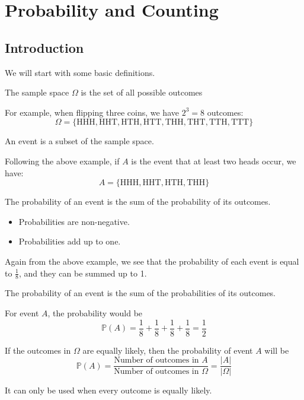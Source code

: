 \chapter{Probability and Counting}

\section{Introduction}

We will start with some basic definitions.

\begin{definition}
    The sample space \(\Omega\) is the set of all possible outcomes
\end{definition}

For example, when flipping three coins, we have \(2^3 = 8\) outcomes:
\[
    \Omega = \{\text{HHH}, \text{HHT}, \text{HTH}, \text{HTT}, \text{THH}, \text{THT}, \text{TTH}, \text{TTT}\}
\]

\begin{definition}[Event]
    An event is a subset of the sample space.
\end{definition}

Following the above example, if \(A\) is the event that at least two heads occur, we have:
\[
    A = \{\text{HHH}, \text{HHT}, \text{HTH}, \text{THH}\}
\]

\begin{definition}
    The probability of an event is the sum of the probability of its outcomes. 
    \begin{itemize}
        \item Probabilities are non-negative.
        \item Probabilities add up to one.
    \end{itemize}
\end{definition}

Again from the above example, we see that the probability of each event is equal to \(\frac{1}{8}\), and they can be summed up to 1. 

\begin{definition}
    The probability of an event is the sum of the probabilities of its outcomes.
\end{definition}

For event \(A\), the probability would be 
\[
    \mathbb{P}(A) = \dfrac{1}{8} + \dfrac{1}{8} + \dfrac{1}{8} + \dfrac{1}{8} = \dfrac{1}{2}
\]

\begin{proposition}
    If the outcomes in \(\Omega\) are equally likely, then the probability of event \(A\) will be 
    \[
        \mathbb{P}(A) = \dfrac{\text{Number of outcomes in }A}{\text{Number of outcomes in }\Omega} = \dfrac{\vert A \vert}{\vert \Omega \vert}
    \]

    \begin{remark}
        It can only be used when every outcome is equally likely.
    \end{remark}
\end{proposition}

